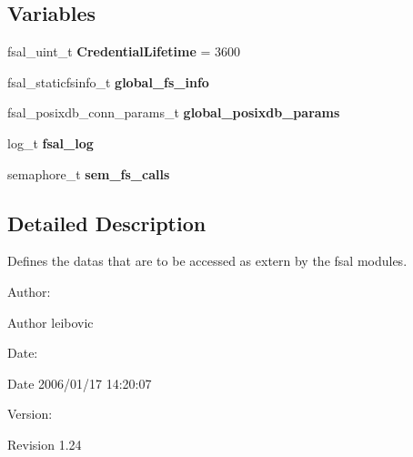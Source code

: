 \subsection*{Variables}
\begin{CompactItemize}
\item 
fsal\_\-uint\_\-t \textbf{CredentialLifetime} = 3600\label{fsal__internal_8c_f3cb7380eea92f3a001fbcbe517e8e1c}

\item 
fsal\_\-staticfsinfo\_\-t \textbf{global\_\-fs\_\-info}\label{fsal__internal_8c_2c43caebcfbbfc95b5d4917b99d70fa1}

\item 
fsal\_\-posixdb\_\-conn\_\-params\_\-t \textbf{global\_\-posixdb\_\-params}\label{fsal__internal_8c_343328efc8e613dfe1511c5bb2991279}

\item 
log\_\-t \textbf{fsal\_\-log}\label{fsal__internal_8c_40064e582b2112b48cbb377868b840b2}

\item 
semaphore\_\-t \textbf{sem\_\-fs\_\-calls}\label{fsal__internal_8c_d249483e6d6223333f220241279dc57d}

\end{CompactItemize}


\subsection{Detailed Description}
Defines the datas that are to be accessed as extern by the fsal modules. 

\begin{Desc}
\item[Author:]\end{Desc}
\begin{Desc}
\item[Author]leibovic \end{Desc}
\begin{Desc}
\item[Date:]\end{Desc}
\begin{Desc}
\item[Date]2006/01/17 14:20:07 \end{Desc}
\begin{Desc}
\item[Version:]\end{Desc}
\begin{Desc}
\item[Revision]1.24 \end{Desc}


